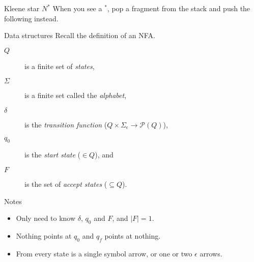\documentclass{beamer}
\begin{document}
\begin{frame}[fragile]{Kleene star $N^*$}
  When you see a $^*$, pop a fragment from the stack and push the following instead.
  
  \vspace{10mm}
  
  \begin{adjustbox}{max width={0.8\textwidth}, center}
  \end{adjustbox}
\end{frame}


\begin{frame}{Data structures}
  Recall the definition of an NFA.
  \begin{description}
    \item[$Q$] is a finite set of \emph{states},
    \item[$\Sigma$] is a finite set called the \emph{alphabet},
    \item[$\delta$] is the \emph{transition function} ($Q \times \Sigma_{\epsilon} \rightarrow \mathcal{P}(Q)$),
    \item[$q_0$] is the \emph{start state} ($\in Q$), and
    \item[$F$] is the set of \emph{accept states} ($\subseteq Q$). 
  \end{description}

  \begin{alertblock}{Notes}
    \begin{itemize}
      \item Only need to know $\delta$, $q_0$ and $F$, and $|F| = 1$.
      \item Nothing points at $q_0$ and $q_f$ points at nothing.
      \item From every state is a single symbol arrow, or one or two $\epsilon$ arrows.
    \end{itemize}
  \end{alertblock}
\end{frame} 
\end{document}
